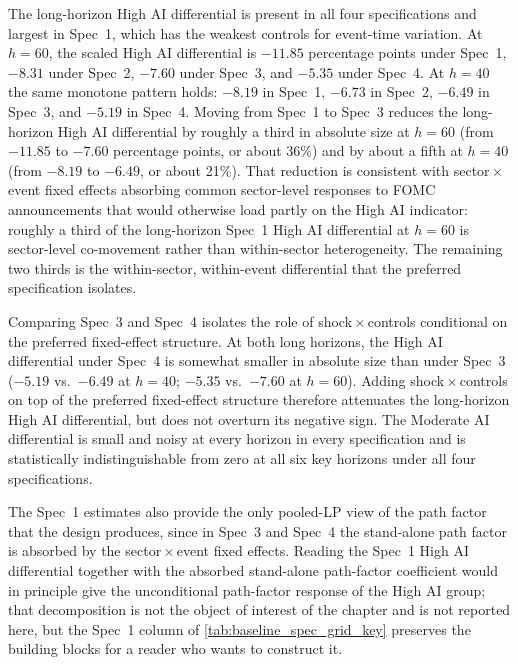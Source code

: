 

The long-horizon High AI differential is present in all four
specifications and largest in Spec~1, which has the weakest controls for
event-time variation. At $h = 60$, the scaled High AI differential is
$-11.85$ percentage points under Spec~1, $-8.31$ under Spec~2, $-7.60$
under Spec~3, and $-5.35$ under Spec~4. At $h = 40$ the same monotone
pattern holds: $-8.19$ in Spec~1, $-6.73$ in Spec~2, $-6.49$ in Spec~3,
and $-5.19$ in Spec~4. Moving from Spec~1 to Spec~3 reduces the
long-horizon High AI differential by roughly a third in absolute size at
$h = 60$ (from $-11.85$ to $-7.60$ percentage points, or about 36\%) and
by about a fifth at $h = 40$ (from $-8.19$ to $-6.49$, or about 21\%). That reduction is consistent with
sector\,$\times$\,event fixed effects absorbing common sector-level
responses to FOMC announcements that would otherwise load partly on the
High AI indicator: roughly a third of the long-horizon Spec~1 High AI
differential at $h = 60$ is sector-level co-movement rather than
within-sector heterogeneity. The remaining two thirds is the
within-sector, within-event differential that the preferred specification
isolates.

Comparing Spec~3 and Spec~4 isolates the role of shock\,$\times$\,controls
conditional on the preferred fixed-effect structure. %
At both long
horizons, the High AI differential under Spec~4 is somewhat smaller in
absolute size than under Spec~3 ($-5.19$ vs.\ $-6.49$ at $h = 40$; $-5.35$
vs.\ $-7.60$ at $h = 60$). Adding shock\,$\times$\,controls on top of the
preferred fixed-effect structure therefore attenuates the long-horizon
High AI differential, but does not overturn its negative sign. The Moderate AI differential is
small and noisy at every horizon in every specification and is
statistically indistinguishable from zero at all six key horizons under
all four specifications.

The Spec~1 estimates also provide the only pooled-LP view of the path
factor that the design produces, since in Spec~3 and Spec~4 the
stand-alone path factor is absorbed by the sector\,$\times$\,event fixed
effects. Reading the Spec~1 High AI differential together with the
absorbed stand-alone path-factor coefficient would in principle give the
unconditional path-factor response of the High AI group; that
decomposition is not the object of interest of the chapter and is not
reported here, but the Spec~1 column of
\cref{tab:baseline_spec_grid_key} preserves the building blocks for a
reader who wants to construct it.

